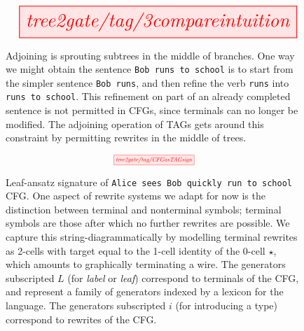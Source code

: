 \begin{figure}
\[\resizebox{0.9\textwidth}{!}{\tikzfig{tree2gate/tag/3compareintuition}}\]
\caption{Adjoining is sprouting subtrees in the middle of branches. One way we might obtain the sentence \texttt{Bob runs to school} is to start from the simpler sentence \texttt{Bob runs}, and then refine the verb \texttt{runs} into \texttt{runs to school}. This refinement on part of an already completed sentence is not permitted in CFGs, since terminals can no longer be modified. The adjoining operation of TAGs gets around this constraint by permitting rewrites in the middle of trees.}
\end{figure}

\begin{figure}[h!]
\[\scalebox{0.6}{\tikzfig{tree2gate/tag/CFGasTAGsign}}\]
\caption{
Leaf-ansatz signature of \texttt{Alice sees Bob quickly run to school} CFG. One aspect of rewrite systems we adapt for now is the distinction between terminal and nonterminal symbols; terminal symbols are those after which no further rewrites are possible. We capture this string-diagrammatically by modelling terminal rewrites as 2-cells with target equal to the 1-cell identity of the 0-cell $\star$, which amounts to graphically terminating a wire. The generators subscripted $L$ (for \emph{label} or \emph{leaf}) correspond to terminals of the CFG, and represent a family of generators indexed by a lexicon for the language. The generators subscripted $i$ (for introducing a type) correspond to rewrites of the CFG.
}
\end{figure}

\clearpage

